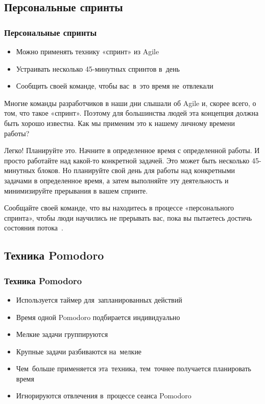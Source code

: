 \documentclass{../industrial-development}
\begin{document}
\subsection{Персональные спринты}

\begin{frame} \frametitle{Персональные спринты}
  \begin{itemize}
  \item Можно применять технику «спринт» из Agile
  \item Устраивать несколько 45-минутных спринтов в~день
  \item Сообщить своей команде, чтобы вас~в~это время не~отвлекали
  \end{itemize}
\end{frame}

\lecturenotes

Многие команды разработчиков в наши дни слышали об Agile и, скорее всего, о том, что такое «спринт». Поэтому для большинства людей эта концепция должна быть хорошо известна. Как мы применим это к нашему личному времени работы?

Легко! Планируйте это. Начните в определенное время с определенной работы. И просто работайте над какой-то конкретной задачей. Это может быть несколько 45-минутных блоков. Но планируйте свой день для работы над конкретными задачами в определенное время, а затем выполняйте эту деятельность и минимизируйте прерывания в вашем спринте.

Сообщайте своей команде, что вы находитесь в процессе «персонального спринта», чтобы люди научились не прерывать вас, пока вы пытаетесь достичь состояния потока~\cite{TMSeimer}.

\subsection{Техника Pomodoro}

\begin{frame} \frametitle{Техника Pomodoro}
  \begin{itemize}
  \item Используется таймер для~запланированных действий
  \item Время одной Pomodoro подбирается индивидуально
  \item Мелкие задачи группируются
  \item Крупные задачи разбиваются на~мелкие
  \item Чем~больше применяется эта~техника, тем~точнее получается планировать время
  \item Игнорируются отвлечения в~процессе сеанса Pomodoro
  \end{itemize}
\end{frame}
\end{document}
